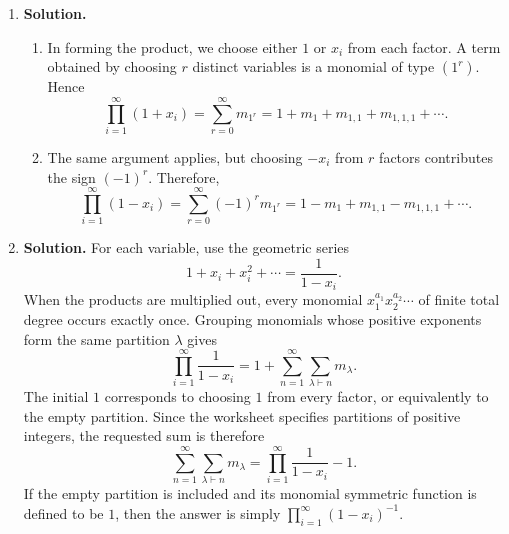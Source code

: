 \documentclass{article}
\begin{document}
\begin{enumerate}
\item \textbf{Solution.}
\begin{enumerate}
\item In forming the product, we choose either $1$ or $x_i$ from each
factor.  A term obtained by choosing $r$ distinct variables is a monomial
of type $(1^r)$.  Hence
\[
\boxed{\prod_{i=1}^{\infty}(1+x_i)
=\sum_{r=0}^{\infty}m_{1^r}
=1+m_1+m_{1,1}+m_{1,1,1}+\cdots.}
\]
\item The same argument applies, but choosing $-x_i$ from $r$ factors
contributes the sign $(-1)^r$.  Therefore,
\[
\boxed{\prod_{i=1}^{\infty}(1-x_i)
=\sum_{r=0}^{\infty}(-1)^r m_{1^r}
=1-m_1+m_{1,1}-m_{1,1,1}+\cdots.}
\]
\end{enumerate}

\item \textbf{Solution.}
For each variable, use the geometric series
\[
1+x_i+x_i^2+\cdots=\frac{1}{1-x_i}.
\]
When the products are multiplied out, every monomial
$x_1^{a_1}x_2^{a_2}\cdots$ of finite total degree occurs exactly once.
Grouping monomials whose positive exponents form the same partition
$\lambda$ gives
\[
\prod_{i=1}^{\infty}\frac{1}{1-x_i}
=1+\sum_{n=1}^{\infty}\sum_{\lambda\vdash n}m_\lambda.
\]
The initial $1$ corresponds to choosing $1$ from every factor, or
equivalently to the empty partition.  Since the worksheet specifies
partitions of positive integers, the requested sum is therefore
\[
\boxed{\sum_{n=1}^{\infty}\sum_{\lambda\vdash n}m_\lambda
=\prod_{i=1}^{\infty}\frac{1}{1-x_i}-1.}
\]
If the empty partition is included and its monomial symmetric function is
defined to be $1$, then the answer is simply
$\prod_{i=1}^{\infty}(1-x_i)^{-1}$.

\end{enumerate}
\end{document}
